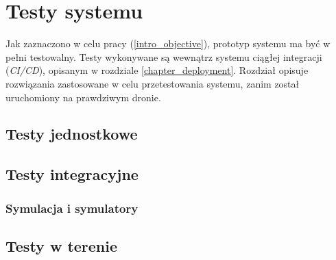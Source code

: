 \chapter{Testy systemu} \label{chapter_tests}

Jak zaznaczono w celu pracy (\ref{intro_objective}), prototyp systemu
ma być w pełni testowalny. Testy wykonywane są wewnątrz systemu ciągłej integracji 
(\textit{CI/CD}), opisanym w rozdziale \ref{chapter_deployment}. Rozdział opisuje
rozwiązania zastosowane w celu przetestowania systemu, zanim został uruchomiony
na prawdziwym dronie.

\section{Testy jednostkowe}
\section{Testy integracyjne}
\subsection{Symulacja i symulatory}
\section{Testy w terenie}


